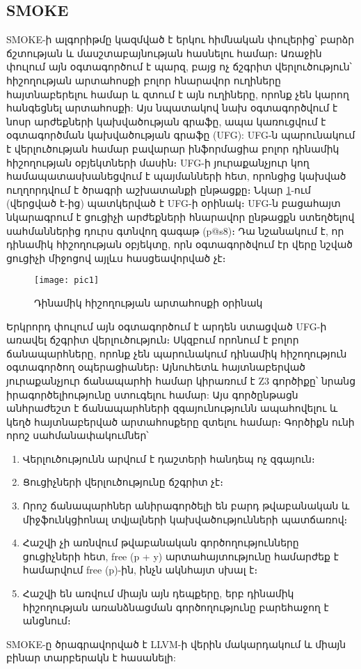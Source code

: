 \subsection{SMOKE}
SMOKE\cite{Fan2019}-ի ալգորիթմը կազմված է երկու հիմնական փուլերից՝ բարձր ճշտության և մասշտաբայնության հասնելու համար։
Առաջին փուլում այն օգտագործում է պարզ, բայց ոչ ճշգրիտ վերլուծություն՝ հիշողության արտահոսքի բոլոր հնարավոր ուղիները
հայտնաբերելու համար և զտում է այն ուղիները, որոնք չեն կարող հանգեցնել արտահոսքի: Այս նպատակով նախ օգտագործվում է նոսր
արժեքների կախվածության գրաֆը, ապա կառուցվում է օգտագործման կախվածության գրաֆը (UFG): UFG-ն պարունակում է վերլուծության
համար բավարար ինֆորմացիա բոլոր դինամիկ հիշողության օբյեկտների մասին։ UFG-ի յուրաքանչյուր կող համապատասխանեցվում է պայմանների հետ,
որոնցից կախված ուղղորդվում է ծրագրի աշխատանքի ընթացքը։
Նկար \ref{fig:figure1}-ում (վերցված է\cite{Fan2019}-ից) պատկերված է UFG-ի օրինակ։ UFG-ն բացահայտ նկարագրում է ցուցիչի արժեքների հնարավոր
ընթացքն ստեղծելով սահմաններից դուրս գտնվող գագաթ (p@s8)։ Դա նշանակում է, որ դինամիկ հիշողության օբյեկտը, որն
օգտագործվում էր վերը նշված ցուցիչի միջոցով այլևս հասցեավորված չէ։

\begin{figure}[h]
    \centering
    \texttt{[image: pic1]}
    \caption{Դինամիկ հիշողության արտահոսքի օրինակ}
    \label{fig:figure1}
\end{figure}

Երկրորդ փուլում այն օգտագործում է արդեն ստացված UFG-ի առավել ճշգրիտ վերլուծություն։ Սկզբում որոնում է բոլոր
ճանապարհները, որոնք չեն պարունակում դինամիկ հիշողություն օգտագործող օպերացիաներ։ Այնուհետև հայտնաբերված յուրաքանչյուր
ճանապարհի համար կիրառում է Z3 գործիքը\cite{Z3}՝ նրանց իրագործելիությունը ստուգելու համար: Այս գործընթացն անհրաժեշտ է
ճանապարհների զգայունությունն ապահովելու և կեղծ հայտնաբերված արտահոսքերը զտելու համար։ Գործիքն ունի որոշ սահմանափակումներ՝
\begin{enumerate}
    \item Վերլուծությունն արվում է դաշտերի հանդեպ ոչ զգայուն։
    \item Ցուցիչների վերլուծությունը ճշգրիտ չէ։
    \item Որոշ ճանապարհներ անիրագործելի են բարդ թվաբանական և միջֆունկցիոնալ տվյալների կախվածությունների պատճառով։
    \item Հաշվի չի առնվում թվաբանական գործողությունները ցուցիչների հետ, free (p + y) արտահայտությունը համարժեք է համարվում free (p)-ին, ինչն ակնհայտ սխալ է։
    \item Հաշվի են առվում միայն այն դեպքերը, երբ դինամիկ հիշողության առանձնացման գործողությունը բարեհաջող է անցնում։
\end{enumerate}

SMOKE-ը ծրագրավորված է LLVM-ի վերին մակարդակում և միայն բինար տարբերակն է հասանելի\cite{SMOKE}:
